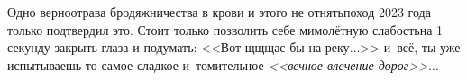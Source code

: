 {{Одно верно\mdash отрава бродяжничества в крови и этого не отнять\mdash поход 2023 года только подтвердил это. Стоит только позволить себе мимолётную слабость\mdash на 1 секунду закрыть глаза и подумать: <<Вот щ\sdash щ\sdash щас бы на реку$\ldots$>> и~всё, ты уже испытываешь то самое сладкое и~томительное \textit{<<вечное влечение дорог>>}$\ldots$

\begin{center}
\end{center}



}

}